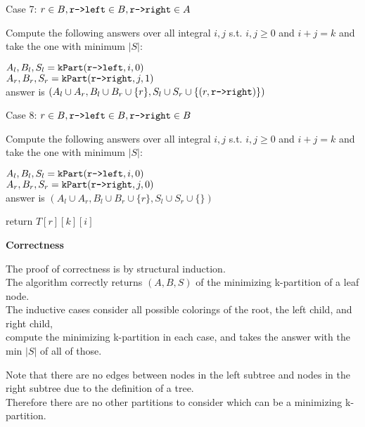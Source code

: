 \documentclass[11pt]{article}
\begin{document}
\begin{indentmore}
\begin{indentmore}
\begin{indentmore}
          Case 7: $r \in B, \texttt{r->left} \in B, \texttt{r->right} \in A$
              \begin{indentmore}
              Compute the following answers over all integral $i,j$  s.t. $i,j \geq 0$ and $i+j = k$ and take the one with minimum $|S|$:
                \begin{indentmore}
                $A_l, B_l, S_l = \mathtt{kPart}(\texttt{r->left},i,0)$\\
                $A_r, B_r, S_r = \mathtt{kPart}(\texttt{r->right},j,1)$\\
                answer is $(A_l \cup A_r,B_l \cup B_r \cup \{r\},S_l \cup S_r \cup \{(r, \texttt{r->right})\})$
                \end{indentmore}
              \end{indentmore}

          Case 8: $r \in B, \texttt{r->left} \in B, \texttt{r->right} \in B$
              \begin{indentmore}
              Compute the following answers over all integral $i,j$  s.t. $i,j \geq 0$ and $i+j = k$ and take the one with minimum $|S|$:
                \begin{indentmore}
                $A_l, B_l, S_l = \mathtt{kPart}(\texttt{r->left},i,0)$\\
                $A_r, B_r, S_r = \mathtt{kPart}(\texttt{r->right},j,0)$\\
                answer is $(A_l \cup A_r,B_l \cup B_r \cup \{r\},S_l \cup S_r \cup \{\})$
                \end{indentmore}
              \end{indentmore}
          \end{indentmore}
        \end{indentmore}


   return $T[r][k][i]$
\end{indentmore}

\textbf{Correctness}

The proof of correctness is by structural induction.\\
The algorithm correctly returns $(A,B,S)$ of the minimizing k-partition of a leaf node.\\
The inductive cases consider all possible colorings of the root, the left child, and right child,\\
compute the minimizing k-partition in each case, and takes the answer with the min $|S|$ of all of those.

Note that there are no edges between nodes in the left subtree and nodes in the right subtree due to the definition of a tree.\\
Therefore there are no other partitions to consider which can be a minimizing k-partition.
\end{document}
